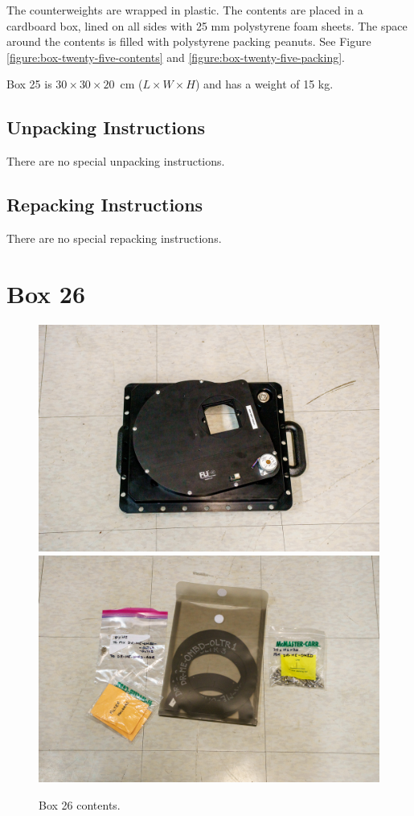 \documentclass{article}
\begin{document}
The counterweights are wrapped in plastic. The contents are placed in a cardboard box, lined on all sides with 25 mm polystyrene foam sheets. The space around the contents is filled with polystyrene packing peanuts. See Figure \ref{figure:box-twenty-five-contents} and \ref{figure:box-twenty-five-packing}.

Box 25 is $30 \times 30 \times 20$~cm ($L \times W \times H$) and has a weight of 15 kg.

\subsection{Unpacking Instructions}

There are no special unpacking instructions.

\subsection{Repacking Instructions}

There are no special repacking instructions.


\clearpage
\section{Box 26}

\begin{figure}[bp]
\begin{center}
\includegraphics[width=0.80\linewidth]{figures/20201208T173642.jpg}\\[\smallskipamount]
\includegraphics[width=0.80\linewidth]{figures/20201208T173648.jpg}
\end{center}
\caption{Box 26 contents.}
\label{figure:box-twenty-six-contents}
\end{figure}
\end{document}
